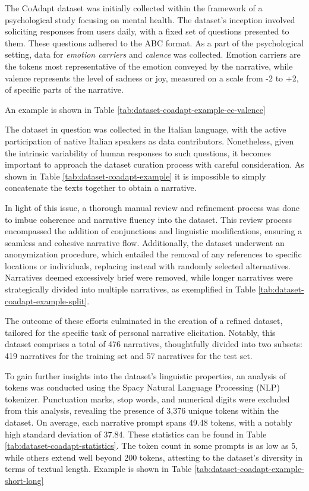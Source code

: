 The CoAdapt dataset was initially collected within the framework of a psychological study focusing on mental health. The dataset's inception involved soliciting responses from users daily, with a fixed set of questions presented to them. These questions adhered to the ABC format. As a part of the psychological setting, data for \emph{emotion carriers} and \emph{calence} was collected. Emotion carriers are the tokens most representative of the emotion conveyed by the narrative, while valence represents the level of sadness or joy, measured on a scale from -2 to +2, of specific parts of the narrative. 


An example is shown in Table \ref{tab:dataset-coadapt-example-ec-valence}

The dataset in question was collected in the Italian language, with the active participation of native Italian speakers as data contributors. Nonetheless, given the intrinsic variability of human responses to such questions, it becomes important to approach the dataset curation process with careful consideration. As shown in Table \ref{tab:dataset-coadapt-example} it is impossible to simply concatenate the texts together to obtain a narrative.


In light of this issue, a thorough manual review and refinement process was done to imbue coherence and narrative fluency into the dataset. This review process encompassed the addition of conjunctions and linguistic modifications, ensuring a seamless and cohesive narrative flow. Additionally, the dataset underwent an anonymization procedure, which entailed the removal of any references to specific locations or individuals, replacing instead with randomly selected alternatives. Narratives deemed excessively brief were removed, while longer narratives were strategically divided into multiple narratives, as exemplified in Table \ref{tab:dataset-coadapt-example-split}.

The outcome of these efforts culminated in the creation of a refined dataset, tailored for the specific task of personal narrative elicitation. Notably, this dataset comprises a total of 476 narratives, thoughtfully divided into two subsets: 419 narratives for the training set and 57 narratives for the test set.


To gain further insights into the dataset's linguistic properties, an analysis of tokens was conducted using the Spacy Natural Language Processing (NLP) tokenizer. Punctuation marks, stop words, and numerical digits were excluded from this analysis, revealing the presence of 3,376 unique tokens within the dataset. On average, each narrative prompt spans 49.48 tokens, with a notably high standard deviation of 37.84. These statistics can be found in Table \ref{tab:dataset-coadapt-statistics}. 
The token count in some prompts is as low as 5, while others extend well beyond 200 tokens, attesting to the dataset's diversity in terms of textual length. Example is shown in Table \ref{tab:dataset-coadapt-example-short-long}

